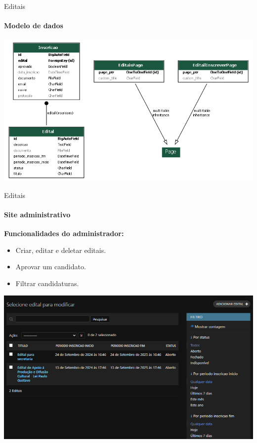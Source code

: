 \begin{frame}{Editais}
\framesubtitle{Modelo de dados}

    \begin{center}
        \includegraphics[height=\textheight]{beamerthemesrc/assets/er_diagram_editais.png}
    \end{center}

    
\end{frame}

\begin{frame}{Editais}
    \framesubtitle{Site administrativo}
    \textbf{Funcionalidades do administrador:}

    \begin{itemize}
        \item Criar, editar e deletar editais.
        \item Aprovar um candidato.
        \item Filtrar candidaturas.
    \end{itemize}
        
            \begin{center}
                \includegraphics[scale=0.3]{beamerthemesrc/assets/admin_edital.png}
            \end{center}
\end{frame}

